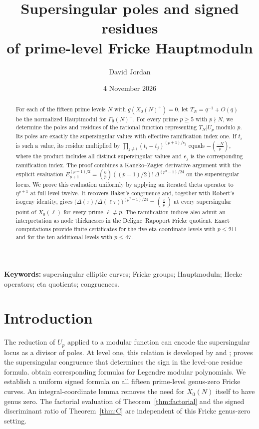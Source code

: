 \documentclass[11pt,a4paper]{article}
\title{Supersingular poles and signed residues\\of prime-level Fricke Hauptmoduln}
\author{David Jordan}
\date{4 November 2026}
\numberwithin{equation}{section}
\theoremstyle{definition}
\theoremstyle{remark}
\begin{document}
\maketitle
\begin{abstract}
For each of the fifteen prime levels $N$ with $g(X_0(N)^+)=0$,
let $T_N=q^{-1}+O(q)$ be the normalized Hauptmodul for
$\Gamma_0(N)^+$. For every prime $p\ge5$ with $p\nmid N$, we determine the poles and
residues of the rational function representing $T_N|U_p$ modulo $p$. Its poles are
exactly the supersingular values with effective ramification index one. If $t_i$ is
such a value, its residue multiplied by
$\prod_{j\ne i}(t_i-t_j)^{(p+1)/e_j}$ equals $-\left(\frac{-N}{p}\right)$, where the
product includes all distinct supersingular values and $e_j$ is the corresponding
ramification index. The proof combines a Kaneko--Zagier derivative argument with
the explicit evaluation
$E_{p+1}^{(p-1)/2}=\left(\frac6p\right)((p-1)/2)!\,\Delta^{(p^2-1)/24}$
on the supersingular locus. We prove this evaluation uniformly by applying an
iterated theta operator to $\eta^{p+1}$ at full level twelve. It recovers Baker's
congruence and, together with Robert's isogeny identity, gives
$\bigl(\Delta(\tau)/\Delta(\ell\tau)\bigr)^{(p^2-1)/24}=\left(\frac{\ell}{p}\right)$
at every supersingular point of $X_0(\ell)$ for every prime $\ell\ne p$.
The ramification indices also admit an interpretation as node thicknesses in the
Deligne--Rapoport Fricke quotient. Exact computations provide finite certificates
for the five eta-coordinate levels with $p\le211$ and for the ten
additional levels with $p\le47$.
\end{abstract}
\noindent\textbf{Keywords:} supersingular elliptic curves; Fricke groups; Hauptmoduln; Hecke operators; eta quotients; congruences.

\section{Introduction}\label{sec:intro}
The reduction of $U_p$ applied to a modular function can encode the supersingular
locus as a divisor of poles. At level one, this relation is developed by \citet{dS94} and \citet[\S10]{KZ98}; \citet{Baker98} proves the
supersingular congruence that determines the sign in the level-one residue formula.
\citet{BL18} obtain corresponding formulas for Legendre modular
polynomials. We establish a uniform signed formula on all fifteen
prime-level genus-zero Fricke curves. An integral-coordinate lemma
removes the need for $X_0(N)$ itself to have genus zero. The factorial evaluation
of Theorem~\ref{thm:factorial} and the signed discriminant ratio of
Theorem~\ref{thm:C} are independent of this Fricke genus-zero setting.
\end{document}
